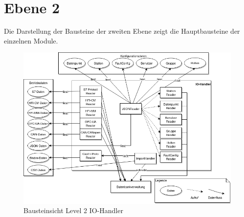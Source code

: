 \section{Ebene 2}
Die Darstellung der Bausteine der zweiten Ebene zeigt die Hauptbausteine der einzelnen Module.
\begin{figure}[h]
	\centering
	\includegraphics[width=1\textwidth]{Graphics/bausteinansicht_ebene_2_IO-Modul.png}
	\caption{Bausteinsicht Level 2 IO-Handler}
	\label{fig:bausteinsichtlvl2_modulIO}
\end{figure}                 

